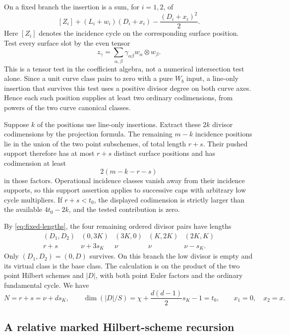 On a fixed branch the insertion is a sum, for \(i=1,2\), of
\begin{equation}
\label{eq:fixed-insertion}
 [Z_i]+(L_i+w_i)(D_i+x_i)-\frac{(D_i+x_i)^2}{2}.
\end{equation}
Here \([Z_i]\) denotes the incidence cycle on the corresponding
surface position.
Test every surface slot by the even tensor
\begin{equation}
\label{eq:surface-test}
 z_\gamma=\sum_{\alpha,\beta}\gamma_{\alpha\beta}
 w_\alpha\otimes w_\beta.
\end{equation}
This is a tensor test in the coefficient algebra, not a numerical
intersection test alone.
Since a unit curve class pairs to zero with a pure \(W_b\) input,
a line-only insertion that survives this test uses a positive divisor
degree on both curve axes. Hence each such position supplies at least
two ordinary codimensions, from powers of the two curve canonical
classes.

Suppose \(k\) of the positions use line-only insertions.
Extract these \(2k\) divisor codimensions by the projection formula.
The remaining \(m-k\) incidence positions lie in the union of the two
point subschemes, of total length \(r+s\). Their pushed support
therefore has at most \(r+s\) distinct surface positions and has
codimension at least
\[
 2(m-k-r-s)
\]
in those factors. Operational incidence classes vanish away from
their incidence supports, so this support assertion applies to
successive caps with arbitrary low cycle multipliers.
If \(r+s<t_0\), the displayed codimension is strictly larger than
the available \(4t_0-2k\), and the tested contribution is zero.

By \eqref{eq:fixed-lengths}, the four remaining ordered divisor pairs
have lengths
\[
\begin{array}{c|cccc}
 (D_1,D_2)&(0,3K)&(3K,0)&(K,2K)&(2K,K)\\ \hline
 r+s&\nu+3s_K&\nu&\nu&\nu-s_K .
\end{array}
\]
Only \((D_1,D_2)=(0,D)\) survives.
On this branch the low divisor is empty and its virtual class is the
base class. The calculation is on the product of the two point
Hilbert schemes and \(|D|\), with both point Euler factors and the
ordinary fundamental cycle. We have
\begin{equation}
\label{eq:surviving-branch}
 N=r+s=\nu+ds_K,\qquad
 \dim(|D|/S)=\chi+\frac{d(d-1)}2s_K-1=t_0,\qquad
 x_1=0,\quad x_2=x.
\end{equation}

\subsection{A relative marked Hilbert-scheme recursion}

